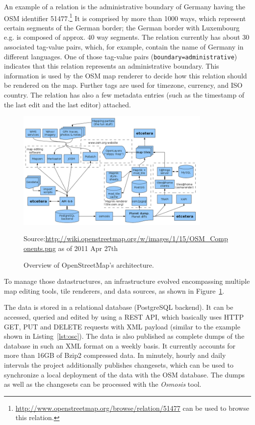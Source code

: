 An example of a relation is the administrative boundary of Germany having the OSM identifier 51477.\footnote{\url{http://www.openstreetmap.org/browse/relation/51477} can be used to browse this relation.}
It is comprised by more than 1000 ways, which represent certain segments of the
German border; the German border with Luxembourg e.g. is composed of approx. 40 way segments. The relation currently has about 30 associated tag-value pairs, which, for example, contain the name of Germany in different languages.
One of those tag-value pairs (\verb|boundary=administrative|) indicates that this relation represents an administrative boundary.
This information is used by the OSM map renderer to decide how this relation should be rendered on the map.
Further tags are used for timezone, currency, and ISO country.
The relation has also a few metadata entries (such as the timestamp of the last edit and the last editor) attached.

\begin{figure}[thb]
	\includegraphics[width=0.85\textwidth]{images/800px-OSM_Components.png}
	\caption{Overview of OpenStreetMap's architecture.}
	\label{fig:osm-overview}
\scriptsize Source:\url{http://wiki.openstreetmap.org/w/images/1/15/OSM_Components.png} as of 2011 Apr 27th
\end{figure}

To manage those datastructures, an infrastructure evolved encompassing multiple map editing tools, tile renderers, and data sources, as shown in Figure~\ref{fig:osm-overview}.

The data is stored in a relational database (PostgreSQL backend).
It can be accessed, queried and edited by using a REST API, which basically uses HTTP GET, PUT and DELETE requests with XML payload (similar to the example shown in Listing~\ref{lst:osc}).
The data is also published as complete dumps of the database in such an XML format on a weekly basis.
It currently accounts for more than 16GB of Bzip2 compressed data.
In minutely, hourly and daily intervals the project additionally publishes changesets, which can be used to synchronize a local deployment of the data with the OSM database.
The dumps as well as the changesets can be processed with the \emph{Osmosis} tool.

